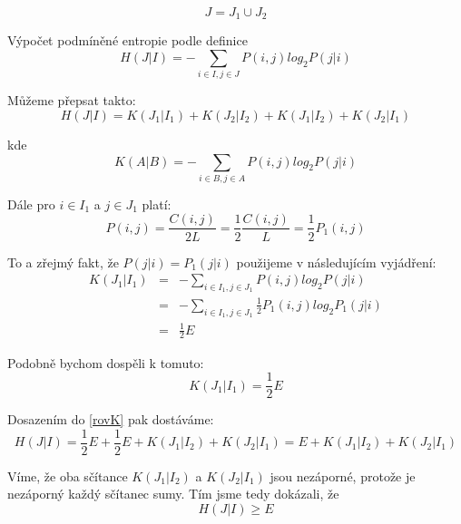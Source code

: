 \documentclass[11pt]{article}
\begin{document}
\begin{equation}
    J = J_1 \cup J_2
\end{equation}

Výpočet podmíněné entropie podle definice
\begin{equation}
H(J|I) =-\sum_{i \in I, j \in J} P(i,j) log_2 P(j|i)
\end{equation}

Můžeme přepsat takto:
\begin{equation}
H(J|I) = K(J_1|I_1) + K(J_2|I_2) + K(J_1|I_2) + K(J_2|I_1)
\label{rovK}
\end{equation}

kde
\begin{equation}
    K(A|B) = -\sum_{i \in B, j \in A} P(i,j) log_2 P(j|i)
\end{equation}


Dále pro $i \in I_1$ a $j \in J_1$ platí:
\begin{equation}
    P(i,j) = \frac{C(i,j)}{2L} = \frac{1}{2} \frac{C(i,j)}{L} = \frac{1}{2} P_1(i,j)
\end{equation}

To a zřejmý fakt, že $P(j|i) = P_1(j|i)$ použijeme v následujícím vyjádření:
\begin{eqnarray}
    K(J_1|I_1) & =& -\sum_{i \in I_1, j \in J_1} P(i,j) log_2 P(j|i) \\
    & = & -\sum_{i \in I_1, j \in J_1} \frac{1}{2} P_1(i,j) log_2 P_1(j|i) \\
    & = & \frac{1}{2} E
\end{eqnarray}

Podobně bychom dospěli k tomuto:
\begin{equation}
    K(J_1|I_1) = \frac{1}{2} E
\end{equation}

Dosazením do \ref{rovK} pak dostáváme:
\begin{equation}
H(J|I) = \frac{1}{2} E + \frac{1}{2} E + K(J_1|I_2) + K(J_2|I_1) = E + K(J_1|I_2) + K(J_2|I_1)
\end{equation}

Víme, že oba sčítance $K(J_1|I_2)$ a $K(J_2|I_1)$ jsou nezáporné, protože je nezáporný každý sčítanec sumy.
Tím jsme tedy dokázali, že
\begin{equation}
    H(J|I) \geq E
\end{equation}
\end{document}
